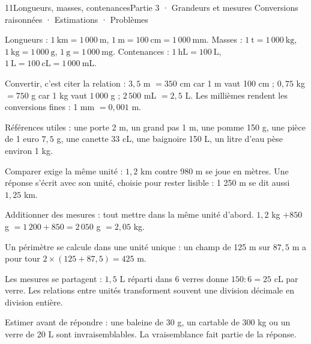 \begin{ouverture}[grandeurs]{11}{Longueurs, masses, contenances}{Partie 3 · Grandeurs et mesures}
{Conversions raisonnées · Estimations · Problèmes}
\end{ouverture}
\pagestyle{otMain}\essentiel\fontsize{11}{15}\selectfont
{}\label{cours-11-1}
\begin{propriete}Longueurs : $1\ \mathrm{km}=1\,000\ \mathrm m$, $1\ \mathrm m=100\ \mathrm{cm}=1\,000\ \mathrm{mm}$. Masses : $1\ \mathrm t=1\,000\ \mathrm{kg}$, $1\ \mathrm{kg}=1\,000\ \mathrm g$, $1\ \mathrm g=1\,000\ \mathrm{mg}$. Contenances : $1\ \mathrm{hL}=100\ \mathrm L$, $1\ \mathrm L=100\ \mathrm{cL}=1\,000\ \mathrm{mL}$.\end{propriete}
\begin{savoirfaire}Convertir, c’est citer la relation : $3{,}5$ m $=350$ cm car 1 m vaut 100 cm ; $0{,}75$ kg $=750$ g car 1 kg vaut $1\,000$ g ; $2\,500$ mL $=2{,}5$ L. Les millièmes rendent les conversions fines : 1 mm $=0{,}001$ m.\end{savoirfaire}
\begin{exemple}Références utiles : une porte 2 m, un grand pas 1 m, une pomme 150 g, une pièce de 1 euro $7{,}5$ g, une canette 33 cL, une baignoire 150 L, un litre d’eau pèse environ 1 kg.\end{exemple}
\begin{attention}Comparer exige la même unité : $1{,}2$ km contre 980 m se joue en mètres. Une réponse s’écrit avec son unité, choisie pour rester lisible : 1 250 m se dit aussi $1{,}25$ km.\end{attention}
\clearpage
{}\label{cours-11-2}
\begin{savoirfaire}Additionner des mesures : tout mettre dans la même unité d’abord. $1{,}2$ kg $+850$ g $=1\,200+850=2\,050$ g $=2{,}05$ kg.\end{savoirfaire}
\begin{exemple}Un périmètre se calcule dans une unité unique : un champ de 125 m sur $87{,}5$ m a pour tour $2\times(125+87{,}5)=425$ m.\end{exemple}
\begin{propriete}Les mesures se partagent : $1{,}5$ L réparti dans 6 verres donne $150:6=25$ cL par verre. Les relations entre unités transforment souvent une division décimale en division entière.\end{propriete}
\begin{attention}Estimer avant de répondre : une baleine de 30 g, un cartable de 300 kg ou un verre de 20 L sont invraisemblables. La vraisemblance fait partie de la réponse.\end{attention}

